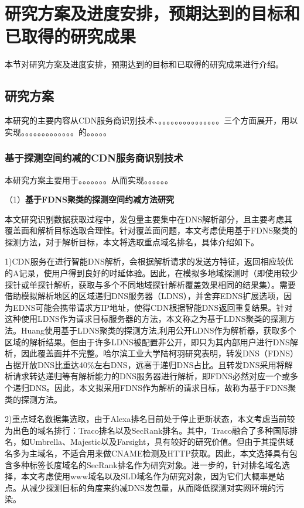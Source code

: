 
\section{研究方案及进度安排，预期达到的目标和已取得的研究成果}
本节对研究方案及进度安排，预期达到的目标和已取得的研究成果进行介绍。
\subsection{研究方案}
本研究的主要内容从CDN服务商识别技术、。。。。。。。。。。。。。。。三个方面展开，用以实现。。。。。。。。。。。。。的。。。。。

\subsubsection{基于探测空间约减的CDN服务商识别技术}
本研究方案主要用于。。。。。。。从而实现。。。。。。


（1）\textbf{基于FDNS聚类的探测空间约减方法研究}  

本文研究识别数据获取过程中，发包量主要集中在DNS解析部分，且主要考虑其覆盖面和解析目标选取合理性。针对覆盖面问题，本文考虑使用基于FDNS聚类的探测方法，对于解析目标，本文将选取重点域名排名，具体介绍如下。

1)CDN服务在进行智能DNS解析，会根据解析请求的发送方特征，返回相应较优的A记录，使用户得到良好的时延体验。因此，在模拟多地域探测时（即使用较少探针或单探针解析，获取与多个不同地域探针解析覆盖效果相同的结果集）。需要借助模拟解析地区的区域递归DNS服务器（LDNS），并舍弃EDNS扩展选项，因为EDNS可能会携带请求方IP地址，使得CDN根据智能DNS返回重复结果。针对这种使用LDNS作为请求目标服务器的方法，本文称之为基于LDNS聚类的探测方法。Huang\cite{Huang2008}使用基于LDNS聚类的探测方法,利用公开LDNS作为解析器，获取多个区域的解析结果。但由于许多LDNS被配置非公开，即只为其内部用户进行DNS解析，因此覆盖面并不完整。哈尔滨工业大学陆柯羽研究表明，转发DNS（FDNS）占据开放DNS比重达40\%左右DNS\cite{lukeyu-2021-DNS}，远高于递归DNS占比。且转发DNS采用将解析请求转达递归等有解析能力的DNS服务器进行解析，即FDNS必然对应一个或多个递归DNS。因此，本文拟采用FDNS作为解析的请求目标，故称为基于FDNS聚类的探测方法。
 

2)重点域名数据集选取，由于Alexa排名目前处于停止更新状态，本文考虑当前较为出色的域名排行：Traco\cite{Pochat2018}排名以及SecRank\cite{Xie2022}排名。其中，Traco融合了多种国际排名，如Umbrella、Majestic以及Farsight，具有较好的研究价值。但由于其提供域名多为主域名，不适合用来做CNAME检测及HTTP获取。因此，本文选择具有包含多种标签长度域名的SecRank排名作为研究对象。进一步的，针对排名域名选择，本文考虑使用www域名以及SLD域名作为研究对象，因为它们大概率是站点。从减少探测目标的角度来约减DNS发包量，从而降低探测对实网环境的污染。 


